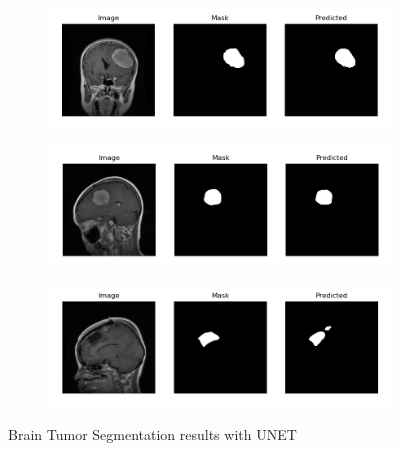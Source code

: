 \begin{figure}[]
    \centering
    \begin{subfigure}{1\textwidth}
        \centering
        \includegraphics[width=\linewidth]{images/results/BTS-unet2.png}
        \subcaption{}
        \label{fig:bts-unet1}
    \end{subfigure}
    \vspace{1em}   
    \begin{subfigure}{1\textwidth}
        \centering
        \includegraphics[width=\linewidth]{images/results/BTS-unet1.png}
        \subcaption{}
        \label{fig:bts-unet2}
    \end{subfigure}
    \vspace{1em}   
    \begin{subfigure}{1\textwidth}
        \centering
        \includegraphics[width=\linewidth]{images/results/BTS-unet6.png}
        \subcaption{}
        \label{fig:bts-unet3}
    \end{subfigure}
    \caption{Brain Tumor Segmentation results with UNET}
    \label{fig:bts-unet}
\end{figure}

